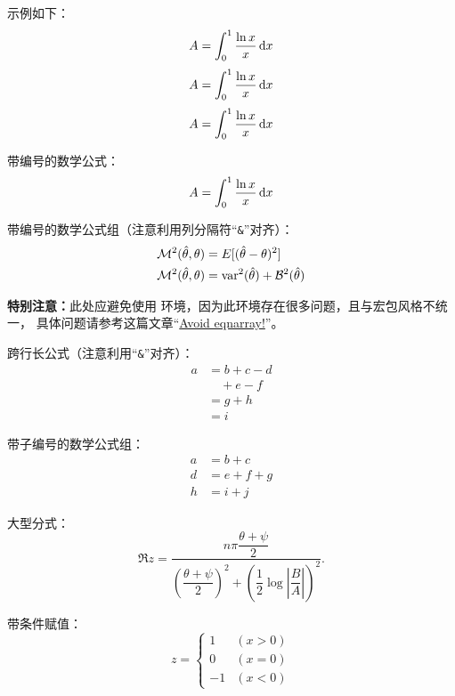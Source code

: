 示例如下：
$$A=\int_0^1 \frac{\ln{x}}{x}\mathop{}\!\mathrm{d} x$$
\[
A=\int_0^1 \frac{\ln{x}}{x}\mathop{}\!\mathrm{d} x
\]
\begin{displaymath}
A=\int_0^1 \frac{\ln{x}}{x}\mathop{}\!\mathrm{d} x
\end{displaymath}

带编号的数学公式：
\begin{equation}\label{eq:samples:one}
A=\int_0^1 \frac{\ln{x}}{x}\mathop{}\!\mathrm{d} x
\end{equation}

带编号的数学公式组（注意利用列分隔符“\texttt{\&}”对齐）：
\begin{align}
\mathcal{M}^2(\hat{\theta},\theta) &= E[(\hat{\theta} - \theta)^2] \\
\mathcal{M}^2(\hat{\theta},\theta) &= \operatorname{var}^2(\hat{\theta}) + {\cal B}^2(\hat{\theta})
\end{align}

\textbf{特别注意：}此处应避免使用  环境，因为此环境存在很多问题，且与宏包风格不统一，
具体问题请参考这篇文章“\href{https://tug.org/pracjourn/2006-4/madsen/madsen.pdf}{Avoid eqnarray!}”。

跨行长公式（注意利用“\texttt{\&}”对齐）：
\begin{equation}
\begin{split}
a& =b+c-d\\
 & \quad +e-f\\
 & =g+h\\
 & =i
\end{split}
\end{equation}

带子编号的数学公式组：
\begin{subequations}\label{eq:samples:grp}
\begin{align}
a&=b+c\label{eq:samples:grp:a}\\
d&=e+f+g\label{eq:samples:grp:b}\\
h&=i+j\label{eq:samples:grp:c}
\end{align}
\end{subequations}

大型分式：
\begin{equation}
\Re{z} =\frac{n\pi \dfrac{\theta +\psi}{2}}{
        \left(\dfrac{\theta +\psi}{2}\right)^2 + \left( \dfrac{1}{2}
        \log \left\lvert\dfrac{B}{A}\right\rvert\right)^2}.
\end{equation}

带条件赋值：
\begin{equation}
z = \left\{
\begin{array}{ll}
 1 & (x>0)\\
 0 & (x=0)\\
-1 & (x<0)
\end{array}
\right.
\end{equation}

